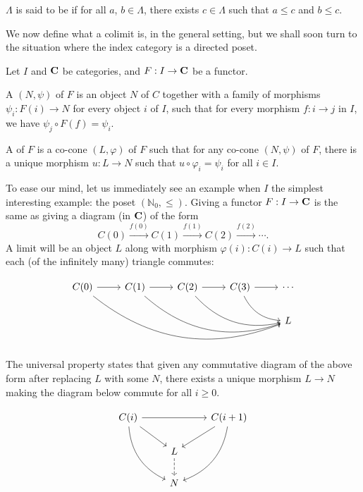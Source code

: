 \documentclass[12pt]{article}
\begin{document}
$\Lambda$ is said to be  if for all $a$, $b \in \Lambda$, there exists $c \in \Lambda$ such that $a \le c$ and $b \le c$.

We now define what a colimit is, in the general setting, but we shall soon turn to the situation where the index category is a directed poset.

\begin{defn}
	Let $I$ and $\mathbf{C}$ be categories, and $F : I \to \mathbf{C}$ be a functor. 

	A  $(N, \psi)$ of $F$ is an object $N$ of $C$ together with a family of morphisms $\psi_{i} : F(i) \to N$ for every object $i$ of $I$, such that for every morphism $f : i \to j$ in $I$, we have $\psi_{j} \circ F(f) = \psi_{i}$.

	A  of $F$ is a co-cone $(L, \varphi)$ of $F$ such that for any co-cone $(N, \psi)$ of $F$, there is a unique morphism $u : L \to N$ such that $u \circ \varphi_{i} = \psi_{i}$ for all $i \in I$.
\end{defn}

To ease our mind, let us immediately see an example when $I$ the simplest interesting example: the poset $(\mathbb{N}_{0}, \le)$. Giving a functor $F : I \to \mathbf{C}$ is the same as giving a diagram (in $\mathbf{C}$) of the form
\begin{equation*} 
	C(0) \xrightarrow{f(0)} C(1) \xrightarrow{f(1)} C(2) \xrightarrow{f(2)} \cdots.
\end{equation*}
A limit will be an object $L$ along with morphism $\varphi(i) : C(i) \to L$ such that each (of the infinitely many) triangle commutes:

\begin{equation*} 
	\begin{tikzcd}
	C(0) \arrow[r] \arrow[rrrrd, bend right] & C(1) \arrow[r] \arrow[rrrd, bend right] & C(2) \arrow[r] \arrow[rrd, bend right] & C(3) \arrow[r] \arrow[rd, bend right] & \cdots \\
	                                         &                                         &                                        &                                       & L     
	\end{tikzcd}
\end{equation*}
The universal property states that given any commutative diagram of the above form after replacing $L$ with some $N$, there exists a unique morphism $L \to N$ making the diagram below commute for all $i \ge 0$.

\begin{equation*} 
	\begin{tikzcd}
	C(i) \arrow[rd] \arrow[rr] \arrow[rdd, bend right] &                     & C(i + 1) \arrow[ld] \arrow[ldd, bend left] \\
	                                                   & L \arrow[d, dashed] &                                            \\
	                                                   & N                   &                                           
	\end{tikzcd}
\end{equation*}
\end{document}
